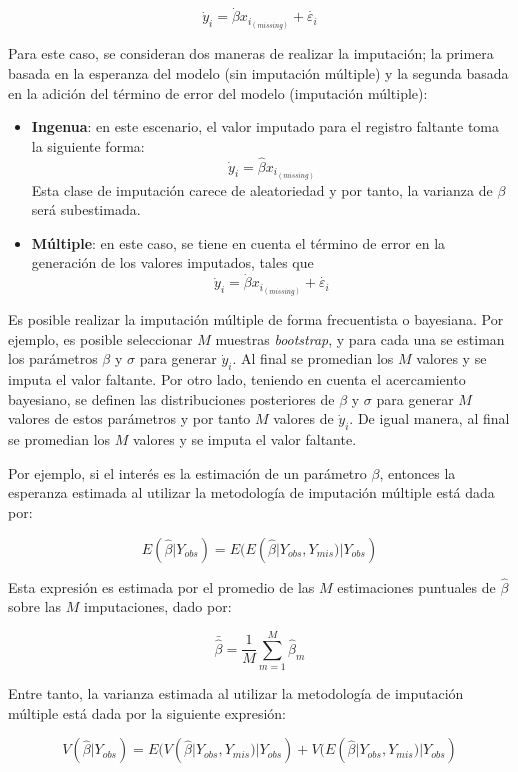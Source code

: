 \documentclass[
  12pt,
]{book}
\providecommand{\tightlist}{%
  \setlength{\itemsep}{0pt}\setlength{\parskip}{0pt}}
\begin{document}
\[\dot{y}_i = \dot{\beta} x_{i_{(missing)}}+ \dot{\varepsilon_i}\]

Para este caso, se consideran dos maneras de realizar la imputación; la primera basada en la esperanza del modelo (sin imputación múltiple) y la segunda basada en la adición del término de error del modelo (imputación múltiple):

\begin{itemize}
\tightlist
\item
  \textbf{Ingenua}: en este escenario, el valor imputado para el registro faltante toma la siguiente forma:
  \[
  \dot{y}_i = \hat\beta x_{i_{(missing)}}
  \]
  Esta clase de imputación carece de aleatoriedad y por tanto, la varianza de \(\beta\) será subestimada.
\item
  \textbf{Múltiple}: en este caso, se tiene en cuenta el término de error en la generación de los valores imputados, tales que
  \[
  \dot{y}_i = \dot{\beta} x_{i_{(missing)}}+ \dot{\varepsilon_i}
  \]
\end{itemize}

Es posible realizar la imputación múltiple de forma frecuentista o bayesiana. Por ejemplo, es posible seleccionar \(M\) muestras \emph{bootstrap}, y para cada una se estiman los parámetros \(\beta\) y \(\sigma\) para generar \(\dot{y}_i\). Al final se promedian los \(M\) valores y se imputa el valor faltante. Por otro lado, teniendo en cuenta el acercamiento bayesiano, se definen las distribuciones posteriores de \(\beta\) y \(\sigma\) para generar \(M\) valores de estos parámetros y por tanto \(M\) valores de \(\dot{y}_i\). De igual manera, al final se promedian los \(M\) valores y se imputa el valor faltante.

Por ejemplo, si el interés es la estimación de un parámetro \(\beta\), entonces la esperanza estimada al utilizar la metodología de imputación múltiple está dada por:

\[
E(\hat{\beta} | Y_{obs}) = E(E(\hat{\beta} | Y_{obs}, Y_{mis}) | Y_{obs})
\]

Esta expresión es estimada por el promedio de las \(M\) estimaciones puntuales de \(\hat{\beta}\) sobre las \(M\) imputaciones, dado por:

\[
\bar{\hat{\beta}} = \frac{1}{M} \sum_{m = 1} ^ M \hat{\beta}_m
\]

Entre tanto, la varianza estimada al utilizar la metodología de imputación múltiple está dada por la siguiente expresión:

\[
V(\hat{\beta} | Y_{obs}) = E(V(\hat{\beta} | Y_{obs}, Y_{mis}) | Y_{obs}) +
V(E(\hat{\beta} | Y_{obs}, Y_{mis}) | Y_{obs}) 
\]
\end{document}
